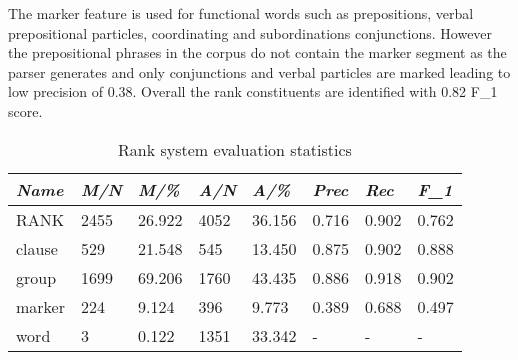 The marker feature is used for functional words such as prepositions, verbal prepositional particles, coordinating and subordinations conjunctions. However the prepositional phrases in the corpus do not contain the marker segment as the parser generates and only conjunctions and verbal particles are marked leading to low precision of 0.38. Overall the rank constituents are identified with 0.82 F_{1} score.

\begin{table}[H]
    \centering
    \begin{tabulary}{\linewidth}{|L|l|l|l|l|l|l|l|}
        \hline
        \textit{Name} & \textit{M/N} & \textit{M/\%} & \textit{A/N} & \textit{A/\%} & \textit{Prec} & \textit{Rec} & \textit{F_{1}} \\ \hline
        RANK          & 2455       & 26.922          & 4052        & 36.156           & 0.716              & 0.902           & 0.762       \\ \hline
        clause        & 529        & 21.548          & 545         & 13.450           & 
        0.875              & 0.902           & 0.888       \\ \hline
        group         & 1699       & 69.206          & 1760        & 43.435           & 0.886              & 0.918           & 0.902       \\ \hline
        marker        & 224        & 9.124           & 396         & 9.773            & 0.389              & 0.688           & 0.497       \\ \hline
        word          & 3          & 0.122           & 1351        & 33.342           & -              & -           & -      \\ \hline
    \end{tabulary}
    \caption{Rank system evaluation statistics}
    \label{tab:rank-statistics}
\end{table}

